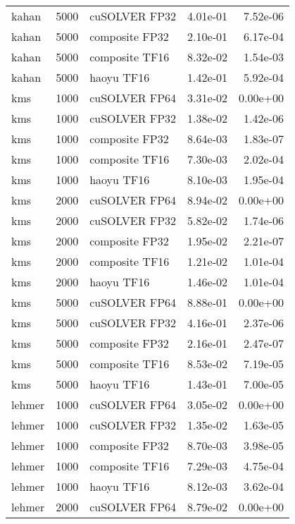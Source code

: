 \begin{table}
\begin{tabular}{lrlrr}
    kahan &  5000 &  cuSOLVER FP32 &  4.01e-01 &        7.52e-06 \\
    kahan &  5000 & composite FP32 &  2.10e-01 &        6.17e-04 \\
    kahan &  5000 & composite TF16 &  8.32e-02 &        1.54e-03 \\
    kahan &  5000 &     haoyu TF16 &  1.42e-01 &        5.92e-04 \\
      kms &  1000 &  cuSOLVER FP64 &  3.31e-02 &        0.00e+00 \\
      kms &  1000 &  cuSOLVER FP32 &  1.38e-02 &        1.42e-06 \\
      kms &  1000 & composite FP32 &  8.64e-03 &        1.83e-07 \\
      kms &  1000 & composite TF16 &  7.30e-03 &        2.02e-04 \\
      kms &  1000 &     haoyu TF16 &  8.10e-03 &        1.95e-04 \\
      kms &  2000 &  cuSOLVER FP64 &  8.94e-02 &        0.00e+00 \\
      kms &  2000 &  cuSOLVER FP32 &  5.82e-02 &        1.74e-06 \\
      kms &  2000 & composite FP32 &  1.95e-02 &        2.21e-07 \\
      kms &  2000 & composite TF16 &  1.21e-02 &        1.01e-04 \\
      kms &  2000 &     haoyu TF16 &  1.46e-02 &        1.01e-04 \\
      kms &  5000 &  cuSOLVER FP64 &  8.88e-01 &        0.00e+00 \\
      kms &  5000 &  cuSOLVER FP32 &  4.16e-01 &        2.37e-06 \\
      kms &  5000 & composite FP32 &  2.16e-01 &        2.47e-07 \\
      kms &  5000 & composite TF16 &  8.53e-02 &        7.19e-05 \\
      kms &  5000 &     haoyu TF16 &  1.43e-01 &        7.00e-05 \\
   lehmer &  1000 &  cuSOLVER FP64 &  3.05e-02 &        0.00e+00 \\
   lehmer &  1000 &  cuSOLVER FP32 &  1.35e-02 &        1.63e-05 \\
   lehmer &  1000 & composite FP32 &  8.70e-03 &        3.98e-05 \\
   lehmer &  1000 & composite TF16 &  7.29e-03 &        4.75e-04 \\
   lehmer &  1000 &     haoyu TF16 &  8.12e-03 &        3.62e-04 \\
   lehmer &  2000 &  cuSOLVER FP64 &  8.79e-02 &        0.00e+00 \\

\end{tabular}
\end{table}
